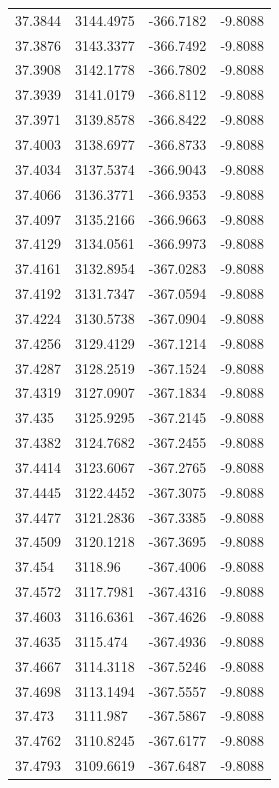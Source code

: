 \begin{table}[H]
\begin{tabular}{llll}
37.3844 & 3144.4975 & -366.7182 & -9.8088 \\
37.3876 & 3143.3377 & -366.7492 & -9.8088 \\
37.3908 & 3142.1778 & -366.7802 & -9.8088 \\
37.3939 & 3141.0179 & -366.8112 & -9.8088 \\
37.3971 & 3139.8578 & -366.8422 & -9.8088 \\
37.4003 & 3138.6977 & -366.8733 & -9.8088 \\
37.4034 & 3137.5374 & -366.9043 & -9.8088 \\
37.4066 & 3136.3771 & -366.9353 & -9.8088 \\
37.4097 & 3135.2166 & -366.9663 & -9.8088 \\
37.4129 & 3134.0561 & -366.9973 & -9.8088 \\
37.4161 & 3132.8954 & -367.0283 & -9.8088 \\
37.4192 & 3131.7347 & -367.0594 & -9.8088 \\
37.4224 & 3130.5738 & -367.0904 & -9.8088 \\
37.4256 & 3129.4129 & -367.1214 & -9.8088 \\
37.4287 & 3128.2519 & -367.1524 & -9.8088 \\
37.4319 & 3127.0907 & -367.1834 & -9.8088 \\
37.435 & 3125.9295 & -367.2145 & -9.8088 \\
37.4382 & 3124.7682 & -367.2455 & -9.8088 \\
37.4414 & 3123.6067 & -367.2765 & -9.8088 \\
37.4445 & 3122.4452 & -367.3075 & -9.8088 \\
37.4477 & 3121.2836 & -367.3385 & -9.8088 \\
37.4509 & 3120.1218 & -367.3695 & -9.8088 \\
37.454 & 3118.96 & -367.4006 & -9.8088 \\
37.4572 & 3117.7981 & -367.4316 & -9.8088 \\
37.4603 & 3116.6361 & -367.4626 & -9.8088 \\
37.4635 & 3115.474 & -367.4936 & -9.8088 \\
37.4667 & 3114.3118 & -367.5246 & -9.8088 \\
37.4698 & 3113.1494 & -367.5557 & -9.8088 \\
37.473 & 3111.987 & -367.5867 & -9.8088 \\
37.4762 & 3110.8245 & -367.6177 & -9.8088 \\
37.4793 & 3109.6619 & -367.6487 & -9.8088 \\

\end{tabular}
\end{table}
